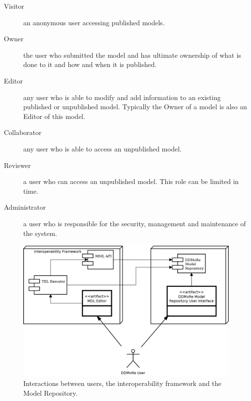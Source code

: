 \begin{description}
  \item[Visitor] an anonymous user accessing \glspl{published model}.
  \item[Owner] the user who submitted the model and has ultimate ownership of what is done to it and how and
when it is published.
  \item[Editor] any user who is able to modify and add information to an existing published or \gls{unpublished model}. Typically the Owner of a model is also an Editor of this model.
  \item[Collaborator] any user who is able to access an unpublished model.
  \item[Reviewer] a user who can access an unpublished model. This role can be limited in time.
  \item[Administrator] a user who is responsible for the security, management and maintenance of the system.
\end{description}

\begin{figure}[hb]
\centering
\includegraphics{img/UserInteraction}
\caption{Interactions between users, the interoperability framework and the Model Repository.}
\label{fig:userInteraction}
\end{figure}
